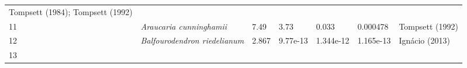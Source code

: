\documentclass[]{article}
\begin{document}
\begin{longtable}[]{@{}lllllll@{}}
\begin{minipage}[t]{0.23\columnwidth}
Tompsett (1984); Tompsett (1992)\strut
\end{minipage}\tabularnewline
\begin{minipage}[t]{0.05\columnwidth}\raggedright
11\strut
\end{minipage} & \begin{minipage}[t]{0.23\columnwidth}\raggedright
\emph{Araucaria cunninghamii}\strut
\end{minipage} & \begin{minipage}[t]{0.05\columnwidth}\raggedright
7.49\strut
\end{minipage} & \begin{minipage}[t]{0.08\columnwidth}\raggedright
3.73\strut
\end{minipage} & \begin{minipage}[t]{0.08\columnwidth}\raggedright
0.033\strut
\end{minipage} & \begin{minipage}[t]{0.08\columnwidth}\raggedright
0.000478\strut
\end{minipage} & \begin{minipage}[t]{0.23\columnwidth}\raggedright
Tompsett (1992)\strut
\end{minipage}\tabularnewline
\begin{minipage}[t]{0.05\columnwidth}\raggedright
12\strut
\end{minipage} & \begin{minipage}[t]{0.23\columnwidth}\raggedright
\emph{Balfourodendron riedelianum}\strut
\end{minipage} & \begin{minipage}[t]{0.05\columnwidth}\raggedright
2.867\strut
\end{minipage} & \begin{minipage}[t]{0.08\columnwidth}\raggedright
9.77e-13\strut
\end{minipage} & \begin{minipage}[t]{0.08\columnwidth}\raggedright
1.344e-12\strut
\end{minipage} & \begin{minipage}[t]{0.08\columnwidth}\raggedright
1.165e-13\strut
\end{minipage} & \begin{minipage}[t]{0.23\columnwidth}\raggedright
Ignácio (2013)\strut
\end{minipage}\tabularnewline
\begin{minipage}[t]{0.05\columnwidth}\raggedright
13\strut
\end{minipage} & \begin{minipage}[t]{0.23\columnwidth}\raggedright

\end{minipage}
\end{longtable}
\end{document}

